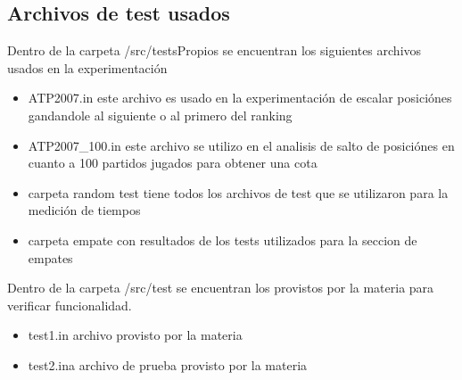\subsection{Archivos de test usados}
Dentro de la carpeta /src/testsPropios se encuentran los siguientes archivos usados en la experimentaci\'on
\begin{itemize}
 \item ATP2007.in este archivo es usado en la experimentaci\'on de escalar posici\'ones gandandole al siguiente o al primero del ranking
 \item ATP2007\_100.in este archivo se utilizo en el analisis de salto de posici\'ones en cuanto a 100 partidos jugados para obtener una cota
 \item carpeta random test tiene todos los archivos de test que se utilizaron para la medici\'on de tiempos
 \item carpeta empate con resultados de los tests utilizados para la seccion de empates
 \end{itemize}

Dentro de la carpeta /src/test se encuentran los provistos por la materia para verificar funcionalidad.
 \begin{itemize}
 \item test1.in archivo provisto por la materia
 \item test2.ina archivo de prueba provisto por la materia
\end{itemize}



